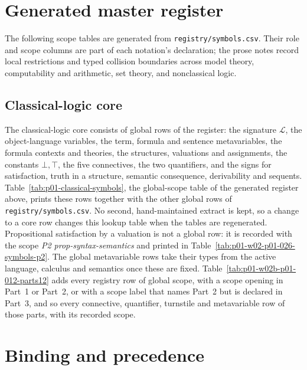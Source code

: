 \section{Generated master register}
\label{sec:p01-generated-symbols}

The following scope tables are generated from
\texttt{registry/symbols.csv}.  Their role and scope columns are part of each
notation's declaration; the prose notes record local restrictions and
typed collision boundaries across model theory, computability and arithmetic,
set theory, and nonclassical logic.



\subsection{Classical-logic core}
\label{sec:p01-classical-symbols}

The classical-logic core consists of global rows of the register: the
signature \(\mathcal L\), the object-language variables, the term, formula
and sentence metavariables, the formula contexts and theories, the
structures, valuations and assignments, the constants \(\bot,\top\), the
five connectives, the two quantifiers, and the signs for satisfaction,
truth in a structure, semantic consequence, derivability and sequents.
Table~\ref{tab:p01-classical-symbols}, the global-scope table of the
generated register above, prints these rows together with the other global
rows of \texttt{registry/symbols.csv}.  No second, hand-maintained extract
is kept, so a change to a core row changes this lookup table when the
tables are regenerated.  Propositional satisfaction by a valuation is not a
global row: it is recorded with the scope \emph{P2 prop-syntax-semantics}
and printed in Table~\ref{tab:p01-w02-p01-026-symbols-p2}.  The global
metavariable rows take their types from the active language, calculus and
semantics once these are fixed.
Table~\ref{tab:p01-w02b-p01-012-parts12} adds every registry row of global scope,
with a scope opening in Part~1 or Part~2, or with a scope label that names
Part~2 but is declared in Part~3, and so every connective, quantifier,
turnstile and metavariable row of those parts, with its recorded scope.

\section{Binding and precedence}
\label{sec:p01-binding-precedence}

